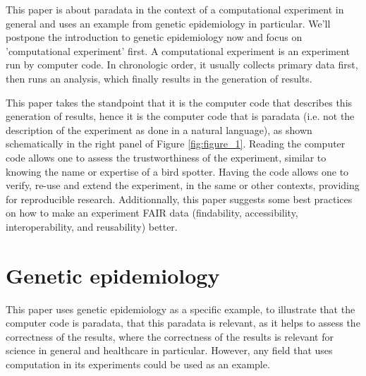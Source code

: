 
This paper is about paradata in the context of a computational
experiment in general and uses an example from genetic 
epidemiology in particular.
We'll postpone the introduction to genetic epidemiology now
and focus on 'computational experiment' first.
A computational experiment is an experiment run by computer code.
In chronologic order, it usually collects primary data first, 
then runs an analysis, which finally results in the generation of results.

This paper takes the standpoint that it is the computer code 
that describes this generation of results, 
hence it is the computer code that is paradata 
(i.e. not the description of the experiment as done in a natural language),
as shown schematically in the right panel of Figure \ref{fig:figure_1}.
Reading the computer code allows one to assess the trustworthiness 
of the experiment, similar to knowing the name or expertise of a bird spotter.
Having the code allows one to 
verify, re-use and extend the experiment, 
in the same or other contexts, providing for reproducible research.
Additionnally, this paper suggests some best practices on how to make 
an experiment FAIR data (findability, accessibility, interoperability, and reusability) \cite{wilkinson2016fair} better.

\section{Genetic epidemiology}


This paper uses genetic epidemiology as a specific example,
to illustrate that the computer code is paradata,
that this paradata is relevant, as it helps 
to assess the correctness of the results,
where the correctness of the results is relevant for 
science in general and healthcare in particular.
However, any field that uses computation in its experiments
could be used as an example.

